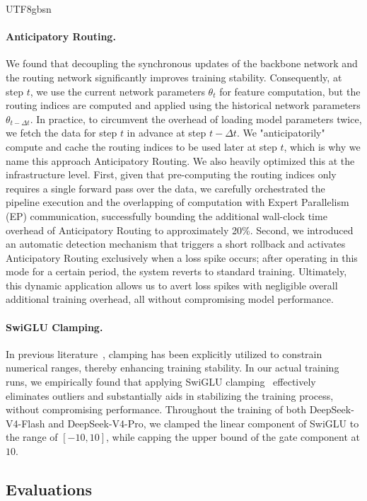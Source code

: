\documentclass[11pt, a4paper, logo, copyright, nonumbering]{deepseek}
\newcommand{\dsvivp}{DeepSeek-V4-Pro}
\newcommand{\dsvivf}{DeepSeek-V4-Flash}
\begin{document}
\begin{CJK*}{UTF8}{gbsn}
\paragraph{Anticipatory Routing.}
We found that decoupling the synchronous updates of the backbone network and the routing network significantly improves training stability. 
Consequently, at step $t$, we use the current network parameters $\theta_t$ for feature computation, but the routing indices are computed and applied using the historical network parameters $\theta_{t-\Delta t}$. 
In practice, to circumvent the overhead of loading model parameters twice, we fetch the data for step $t$ in advance at step $t-\Delta t$. 
We "anticipatorily" compute and cache the routing indices to be used later at step $t$, which is why we name this approach Anticipatory Routing. 
We also heavily optimized this at the infrastructure level. 
First, given that pre-computing the routing indices only requires a single forward pass over the data, we carefully orchestrated the pipeline execution and the overlapping of computation with Expert Parallelism (EP) communication, successfully bounding the additional wall-clock time overhead of Anticipatory Routing to approximately 20\%. 
Second, we introduced an automatic detection mechanism that triggers a short rollback and activates Anticipatory Routing exclusively when a loss spike occurs; after operating in this mode for a certain period, the system reverts to standard training. 
Ultimately, this dynamic application allows us to avert loss spikes with negligible overall additional training overhead, all without compromising model performance.

\paragraph{SwiGLU Clamping.}
In previous literature~\citep{bello*2017neural, gemma2}, clamping has been explicitly utilized to constrain numerical ranges, thereby enhancing training stability. 
In our actual training runs, we empirically found that applying SwiGLU clamping~\citep{gpt_oss} effectively eliminates outliers and substantially aids in stabilizing the training process, without compromising performance. 
Throughout the training of both \dsvivf{} and \dsvivp{}, we clamped the linear component of SwiGLU to the range of $[-10, 10]$, while capping the upper bound of the gate component at $10$.

\subsection{Evaluations}


\end{CJK*}
\end{document}
